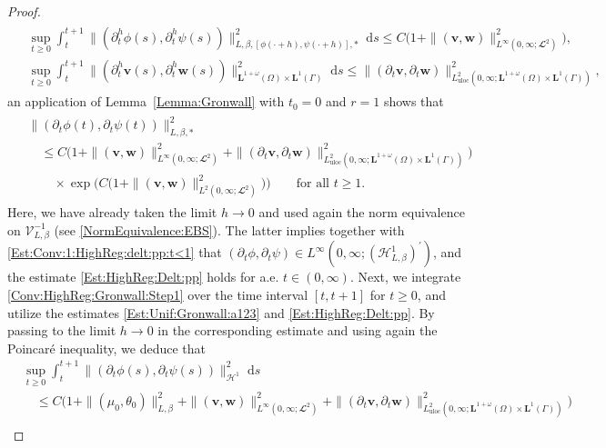 \documentclass[10pt,reqno]{amsart}
\theoremstyle{remark}
\numberwithin{equation}{section}
\newcommand{\norm}[1]{\| #1 \|}
\newcommand{\bv}{\mathbf{v}}
\newcommand{\bw}{\mathbf{w}}
\newcommand{\ds}{\;\mathrm ds}
\newcommand{\delt}{\partial_{t}}
\newcommand{\delth}{\partial_{t}^{h}}
\newcommand{\Om}{\Omega}
\newcommand{\Ga}{\Gamma}
\begin{document}
\begin{proof}
\begin{align}
\begin{split}
            &\sup_{t\geq 0}\int_t^{t+1}\norm{(\delth\phi(s),\delth\psi(s))}_{L,\beta,[\phi(\cdot+h),\psi(\cdot+h)],\ast}^2 \ds \leq C\big(1 + \norm{(\bv,\bw)}_{L^\infty(0,\infty;\mathbfcal{L}^2)}^2\big), \\
            &\sup_{t\geq 0} \int_t^{t+1} \norm{(\delth\mathbf{v}(s),\delth\mathbf{w}(s))}_{\mathbf{L}^{1+\omega}(\Om)\times\mathbf{L}^1(\Ga)}^2\ds\leq \norm{(\delt\bv,\delt\bw)}_{L^2_{\mathrm{uloc}}(0,\infty;\mathbf{L}^{1+\omega}(\Om)\times\mathbf{L}^1(\Ga))}^2,
        \end{split}
    \end{align}
    an application of Lemma~\ref{Lemma:Gronwall} with $t_0 = 0$ and $r = 1$ shows that
    \begin{align}\label{Est:HighReg:Delt:pp}
        \begin{split}
            &\norm{(\delt\phi(t),\delt\psi(t))}_{L,\beta,\ast}^2 \\
            &\quad \leq C\big(1 + \norm{(\bv,\bw)}_{L^\infty(0,\infty;\mathbfcal{L}^2)}^2 + \norm{(\delt\bv,\delt\bw)}_{L^2_{\mathrm{uloc}}(0,\infty;\mathbf{L}^{1+\omega}(\Om)\times\mathbf{L}^1(\Ga))}^2\big)\\
            &\qquad\times \exp\Big(C\big(1 + \norm{(\bv,\bw)}_{L^2(0,\infty;\mathbfcal{L}^2)}^2\big)\Big) \qquad\text{for~all~}t\geq1.
        \end{split}
    \end{align}
    Here, we have already taken the limit $h\rightarrow 0$ and used again the norm equivalence on $\mathcal{V}^{-1}_{L,\beta}$ (see \eqref{NormEquivalence:EBS}).
    The latter implies together with \eqref{Est:Conv:1:HighReg:delt:pp:t<1} that $(\delt\phi,\delt\psi)\in L^\infty(0,\infty;(\mathcal{H}^1_{L,\beta})^\prime)$, and the estimate \eqref{Est:HighReg:Delt:pp} holds for a.e. $t\in(0,\infty)$. Next, we integrate \eqref{Conv:HighReg:Gronwall:Step1} over the time interval $[t,t+1]$ for $t\geq0$, and utilize the estimates \eqref{Est:Unif:Gronwall:a123} and \eqref{Est:HighReg:Delt:pp}. By passing to the limit $h\rightarrow 0$ in the corresponding estimate and using again the Poincar\'{e} inequality, we deduce that
    \begin{align}\label{Est:HighReg:pp:K}
        &\sup_{t\geq0}\int_t^{t+1} \norm{(\delt\phi(s),\delt\psi(s))}_{\mathcal{H}^1}^2\ds \nonumber \\
        &\quad\leq C\Big(1 + \norm{(\mu_0,\theta_0)}_{L,\beta}^2 + \norm{(\bv,\bw)}_{L^\infty(0,\infty;\mathbfcal{L}^2)}^2 + \norm{(\delt\bv,\delt\bw)}_{L^2_{\mathrm{uloc}}(0,\infty;\mathbf{L}^{1+\omega}(\Om)\times\mathbf{L}^1(\Ga))}^2\Big) \\

\end{align}
\end{proof}
\end{document}
